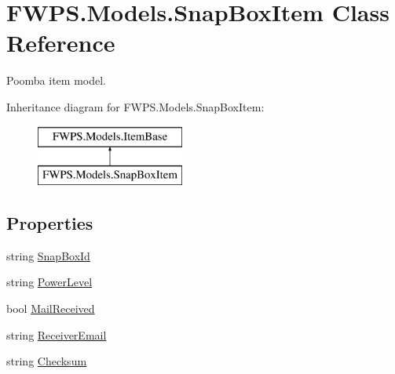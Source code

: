 \hypertarget{class_f_w_p_s_1_1_models_1_1_snap_box_item}{}\section{F\+W\+P\+S.\+Models.\+Snap\+Box\+Item Class Reference}
\label{class_f_w_p_s_1_1_models_1_1_snap_box_item}


Poomba item model.  


Inheritance diagram for F\+W\+P\+S.\+Models.\+Snap\+Box\+Item\+:\begin{figure}[H]
\begin{center}
\leavevmode
\includegraphics[height=2.000000cm]{class_f_w_p_s_1_1_models_1_1_snap_box_item}
\end{center}
\end{figure}
\subsection*{Properties}
\begin{DoxyCompactItemize}
\item 
string \mbox{\hyperlink{class_f_w_p_s_1_1_models_1_1_snap_box_item_a333d7e192030bd46eb690a0922d3fd00}{Snap\+Box\+Id}}
\item 
string \mbox{\hyperlink{class_f_w_p_s_1_1_models_1_1_snap_box_item_a7ea1254365bd74609eaf1638a6d31483}{Power\+Level}}
\item 
bool \mbox{\hyperlink{class_f_w_p_s_1_1_models_1_1_snap_box_item_acf87fbed1dfb543f3e099b0d9a56022c}{Mail\+Received}}
\item 
string \mbox{\hyperlink{class_f_w_p_s_1_1_models_1_1_snap_box_item_a4e05d84bd6524ef562cd6c3f0af271ec}{Receiver\+Email}}
\item 
string \mbox{\hyperlink{class_f_w_p_s_1_1_models_1_1_snap_box_item_ac110324514e9b34b71230d7289aa2a3e}{Checksum}}
\end{DoxyCompactItemize}
